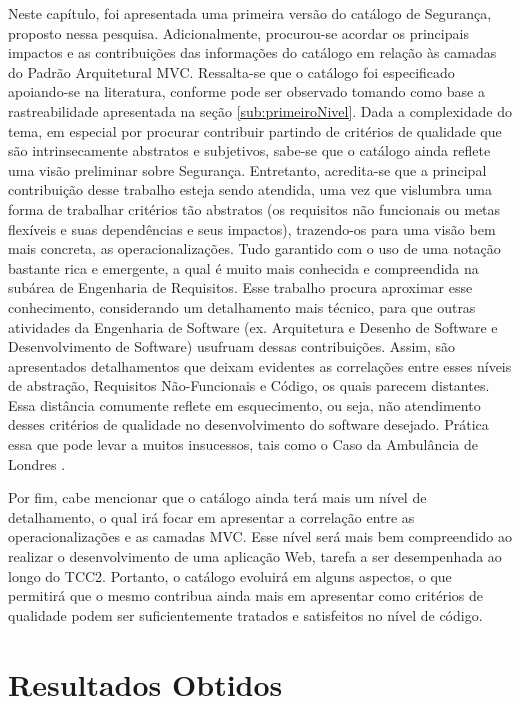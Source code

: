 Neste capítulo, foi apresentada uma primeira versão do catálogo de Segurança, proposto nessa pesquisa. Adicionalmente, procurou-se acordar os principais impactos e as contribuições das informações do catálogo em relação às camadas do Padrão Arquitetural MVC. Ressalta-se que o catálogo foi especificado apoiando-se na literatura, conforme pode ser observado tomando como base a rastreabilidade apresentada na seção \ref{sub:primeiroNivel}.
Dada a complexidade do tema, em especial por procurar contribuir partindo de critérios de qualidade que são intrinsecamente abstratos e subjetivos, sabe-se que o catálogo ainda reflete uma visão preliminar sobre Segurança. Entretanto, acredita-se que a principal contribuição desse trabalho esteja sendo atendida, uma vez que vislumbra uma forma de trabalhar critérios tão abstratos (os requisitos não funcionais ou metas flexíveis e suas dependências e seus impactos), trazendo-os para uma visão bem mais concreta, as operacionalizações. Tudo garantido com o uso de uma notação bastante rica e emergente, a qual é muito mais conhecida e compreendida na subárea de Engenharia de Requisitos. Esse trabalho procura aproximar esse conhecimento, considerando um detalhamento mais técnico, para que outras atividades da Engenharia de Software (ex. Arquitetura e Desenho de Software e Desenvolvimento de Software) usufruam dessas contribuições. Assim, são apresentados detalhamentos que deixam evidentes as correlações entre esses níveis de abstração, Requisitos Não-Funcionais e Código, os quais parecem distantes. Essa distância comumente reflete em esquecimento, ou seja, não atendimento desses critérios de qualidade no desenvolvimento do software desejado. Prática essa que pode levar a muitos insucessos, tais como o Caso da Ambulância de Londres \cite{finkelstein1996comedy}.


Por fim, cabe mencionar que o catálogo ainda terá mais um nível de detalhamento, o qual irá focar em apresentar a correlação entre as operacionalizações e as camadas MVC. Esse nível será mais bem compreendido ao realizar o desenvolvimento de uma aplicação Web, tarefa a ser desempenhada ao longo do TCC2. Portanto, o catálogo evoluirá em alguns aspectos, o que permitirá que o mesmo contribua ainda mais em apresentar como critérios de qualidade podem ser suficientemente tratados e satisfeitos no nível de código.


\chapter{Resultados Obtidos}
\label{chap:resultados obtidos}

